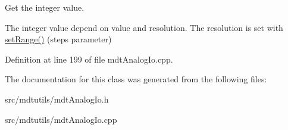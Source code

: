 Get the integer value. 

The integer value depend on value and resolution. The resolution is set with \hyperlink{classmdt_analog_io_ab5733c8d4f49da6e6d4f11f1e1aa9555}{setRange()} (steps parameter) 

Definition at line 199 of file mdtAnalogIo.cpp.



The documentation for this class was generated from the following files:\begin{DoxyCompactItemize}
\item 
src/mdtutils/mdtAnalogIo.h\item 
src/mdtutils/mdtAnalogIo.cpp\end{DoxyCompactItemize}
